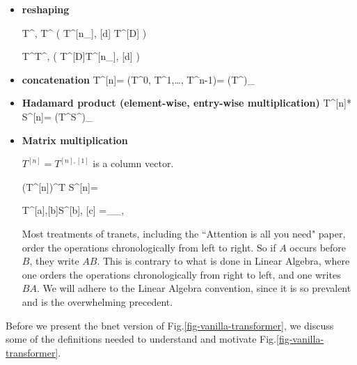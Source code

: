 \begin{itemize}

\item{\bf reshaping}

\beq
T^{\nu, \delta}\rarrow T^{\Delta}
\;\;
\left(
T^{[n_\rvh], [d]} \rarrow T^{[D]}
\right)
\eeq

\beq
T^{\Delta}\rarrow T^{\nu, \delta}
\;\;
\left(
T^{[D]}\rarrow T^{[n_\rvh], [d]}
\right)
\eeq

\item {\bf concatenation}
\beq
T^{[n]}= (T^0, T^1,\ldots, T^{n-1})= 
(T^\nu)_{\nu\in[n]}
\eeq

\item {\bf Hadamard product (element-wise, entry-wise multiplication)}
\beq
T^{[n]}* S^{[n]}= (T^\nu S^\nu)_{\nu\in[n]}
\eeq


\item {\bf Matrix multiplication}

$T^{[n]}= T^{[n], [1]}$ is a column vector.

\beq
(T^{[n]})^T S^{[n]}=
\eeq

\beq
T^{[a],[b]}S^{[b], [c]}
=
_{\alp_\in [a], \gamma \in [c]}
\eeq

Most treatments of tranets, including the
``Attention is all you need" paper,  order the
operations chronologically from
left to right. So if $A$ occurs before $B$,
they write $AB$.
This is contrary 
to what is done in Linear Algebra, where one 
orders the operations chronologically from right to left, and one writes $BA$.
We will adhere to the Linear Algebra
convention, since it is so prevalent
and is the overwhelming precedent.
\end{itemize}



Before we present the bnet
version of Fig.\ref{fig-vanilla-transformer},
we discuss some of the 
definitions needed to
understand and motivate
 Fig.\ref{fig-vanilla-transformer}.
 
